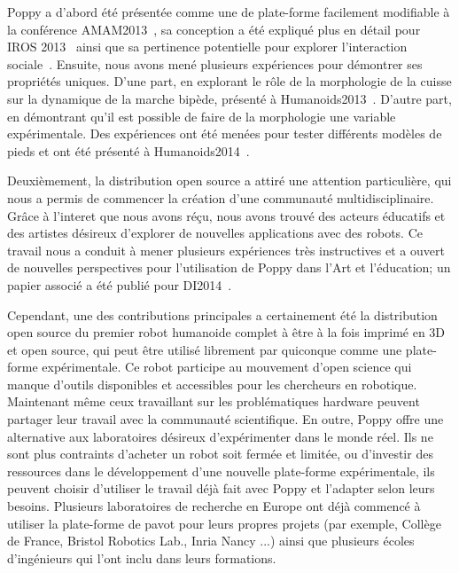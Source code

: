 Poppy a d'abord été présentée comme une de plate-forme facilement modifiable à la conférence AMAM2013~\parencite{lapeyre:hal-00788433}, sa conception a été expliqué plus en détail pour IROS 2013~\parencite{lapeyre:hal-00852858} ainsi que sa pertinence potentielle pour explorer l'interaction sociale~\parencite{lapeyre:hal-00984312}. Ensuite, nous avons mené plusieurs expériences pour démontrer ses propriétés uniques. D'une part, en explorant le rôle de la morphologie de la cuisse sur la dynamique de la marche bipède, présenté à Humanoids2013~\parencite{lapeyre:hal-00861110}. D'autre part, en démontrant qu'il est possible de faire de la morphologie une variable expérimentale. Des expériences ont été menées pour tester différents modèles de pieds et ont été présenté à Humanoids2014~\parencite{lapeyre2014humanoids}.

Deuxièmement, la distribution open source a attiré une attention particulière, qui nous a permis de commencer la création d'une communauté multidisciplinaire. Grâce à l'interet que nous avons réçu, nous avons trouvé des acteurs éducatifs et des artistes désireux d'explorer de nouvelles applications avec des robots. Ce travail nous a conduit à mener plusieurs expériences très instructives et a ouvert de nouvelles perspectives pour l'utilisation de Poppy dans l'Art et l'éducation; un papier associé a été publié pour DI2014~\parencite{lapeyreDI}.

Cependant, une des contributions principales a certainement été la distribution open source du premier robot humanoide complet à être à la fois imprimé en 3D et open source, qui peut être utilisé librement par quiconque comme une plate-forme expérimentale. 
Ce robot participe au mouvement d'open science qui manque d'outils disponibles et accessibles pour les chercheurs en robotique.  Maintenant même ceux travaillant sur les problématiques hardware peuvent partager leur travail avec la communauté scientifique. En outre, Poppy offre une alternative aux laboratoires désireux d'expérimenter dans le monde réel. Ils ne sont plus contraints d'acheter un robot soit fermée et limitée, ou d'investir des ressources dans le développement d'une nouvelle plate-forme expérimentale, ils peuvent choisir d'utiliser le travail déjà fait avec Poppy et l'adapter selon leurs besoins.
Plusieurs laboratoires de recherche en Europe ont déjà commencé à utiliser la plate-forme de pavot pour leurs propres projets (par exemple, Collège de France, Bristol Robotics Lab., Inria Nancy ...) ainsi que plusieurs écoles d'ingénieurs qui l'ont inclu dans leurs formations.

